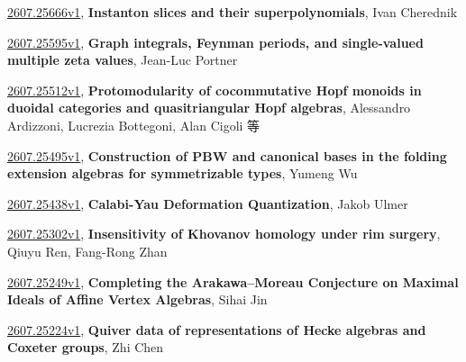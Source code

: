 \documentclass[9pt, a4paper]{article}
\theoremstyle{plain}
\theoremstyle{definition}
\theoremstyle{remark}
\newcommand{\arxiv}[3]{\href{https://arxiv.org/abs/#1}{#1}, \textbf{\textcolor{arxivblue}{#2}}, #3}
\begin{document}
\arxiv{2607.25666v1}{Instanton slices and their superpolynomials}{Ivan Cherednik}

\arxiv{2607.25595v1}{Graph integrals, Feynman periods, and single-valued multiple zeta values}{Jean-Luc Portner}

\arxiv{2607.25512v1}{Protomodularity of cocommutative Hopf monoids in duoidal categories and quasitriangular Hopf algebras}{Alessandro Ardizzoni, Lucrezia Bottegoni, Alan Cigoli 等}

\arxiv{2607.25495v1}{Construction of PBW and canonical bases in the folding extension algebras for symmetrizable types}{Yumeng Wu}

\arxiv{2607.25438v1}{Calabi-Yau Deformation Quantization}{Jakob Ulmer}

\arxiv{2607.25302v1}{Insensitivity of Khovanov homology under rim surgery}{Qiuyu Ren, Fang-Rong Zhan}

\arxiv{2607.25249v1}{Completing the Arakawa--Moreau Conjecture on Maximal Ideals of Affine Vertex Algebras}{Sihai Jin}

\arxiv{2607.25224v1}{Quiver data of representations of Hecke algebras and Coxeter groups}{Zhi Chen}

\end{document}
